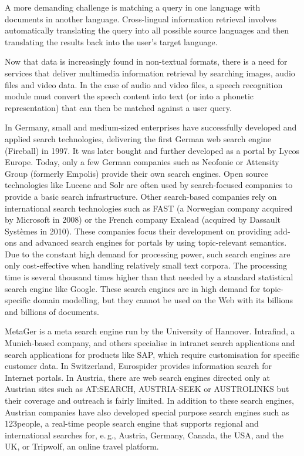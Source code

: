 \begin{multicols}{2}
A more demanding challenge is matching a query in one language with documents in another language. Cross-lingual information retrieval involves automatically translating the query into all possible source languages and then translating the results back into the user's target language.

Now that data is increasingly found in non-textual formats, there is a need for services that deliver multimedia information retrieval by searching images, audio files and video data. In the case of audio and video files, a speech recognition module must convert the speech content into text (or into a phonetic representation) that can then be matched against a user query.

In Germany, small and medium-sized enterprises have successfully developed and applied search technologies, delivering the first German web search engine (Fireball) in 1997. It was later bought and further developed as a portal by Lycos Europe. Today, only a few German companies such as Neofonie or Attensity Group (formerly Empolis) provide their own search engines. Open source technologies like Lucene and Solr are often used by search-focused companies to provide a basic search infrastructure. Other search-based companies rely on international search technologies such as FAST (a Norwegian company acquired by Microsoft in 2008) or the French company Exalead (acquired by Dassault Systèmes in 2010). These companies focus their development on providing add-ons and advanced search engines for portals by using topic-relevant semantics. Due to the constant high demand for processing power, such search engines are only cost-effective when handling relatively small text corpora. The processing time is several thousand times higher than that needed by a standard statistical search engine like Google. These search engines are in high demand for topic-specific domain modelling, but they cannot be used on the Web with its billions and billions of documents.

MetaGer is a meta search engine run by the University of Hannover. Intrafind, a Munich-based company, and others specialise in intranet search applications and search applications for products like SAP, which require customisation for specific customer data. In Switzerland, Eurospider provides information search for Internet portals. In Austria, there are web search engines directed only at Austrian sites such as AT:SEARCH, AUSTRIA-SEEK or AUSTROLINKS but their coverage and outreach is fairly limited. In addition to these search engines, Austrian companies have also developed special purpose search engines such as 123people, a real-time people search engine that supports regional and international searches for, e.\,g., Austria, Germany, Canada, the USA, and the UK, or Tripwolf, an online travel platform.


\end{multicols}
